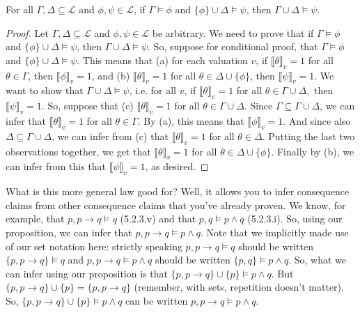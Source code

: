 \begin{enumerate}[\thesection.1]
		\begin{proposition}
		For all $\Gamma,\Delta\subseteq\mathcal{L}$ and $\phi,\psi\in\mathcal{L}$, if $\Gamma\vDash\phi$ and $\{\phi\}\cup\Delta\vDash\psi$, then $\Gamma\cup\Delta\vDash\psi$.
		\end{proposition}
		\begin{proof}
		Let $\Gamma,\Delta\subseteq\mathcal{L}$ and $\phi,\psi\in\mathcal{L}$ be arbitrary. We need to prove that  if $\Gamma\vDash\phi$ and $\{\phi\}\cup\Delta\vDash\psi$, then $\Gamma\cup\Delta\vDash\psi$. So, suppose for conditional proof, that $\Gamma\vDash\phi$ and $\{\phi\}\cup\Delta\vDash\psi$. This means that (a) for each valuation $v$, if $\llbracket\theta\rrbracket_v=1$ for all $\theta\in\Gamma$, then $\llbracket \phi\rrbracket_v=1$, and (b) $\llbracket\theta\rrbracket_v=1$ for all $\theta\in\Delta\cup\{\phi\}$, then $\llbracket \psi\rrbracket_v=1$. We want to show that $\Gamma\cup\Delta\vDash\psi$, i.e. for all $v$, if $\llbracket \theta\rrbracket_v=1$ for all $\theta\in\Gamma\cup\Delta,$ then $\llbracket\psi\rrbracket_v=1$. So, suppose that (c) $\llbracket \theta\rrbracket_v=1$ for all $\theta\in\Gamma\cup\Delta$. Since $\Gamma\subseteq \Gamma\cup \Delta$, we can infer that $\llbracket \theta\rrbracket_v=1$ for all $\theta\in\Gamma$. By (a), this means that $\llbracket \phi\rrbracket_v=1$. And since also $\Delta\subseteq \Gamma\cup \Delta$, we can infer from (c) that $\llbracket \theta\rrbracket_v=1$ for all $\theta\in\Delta$. Putting the last two observations together, we get that $\llbracket\theta\rrbracket_v=1$ for all $\theta\in\Delta\cup\{\phi\}$. Finally by (b), we can infer from this that $\llbracket\psi\rrbracket_v=1$, as desired.
		\end{proof}
What is this more general law good for? Well, it allows you to infer consequence claims from other consequence claims that you've already proven. We know, for example, that $p, p\to q\vDash q$ (5.2.3.v) and that $p,q\vDash p\land q$ (5.2.3.i). So, using our proposition, we can infer that $p,p\to q\vDash p\land q$. Note that we implicitly made use of our set notation here: strictly speaking  $p, p\to q\vDash q$ should be written  $\{p, p\to q\}\vDash q$ and $p,p\to q\vDash p\land q$ should be written $\{p,q\}\vDash p\land q$. So, what we can infer using our proposition is that $\{p, p\to q\}\cup \{p\}\vDash p\land q$. But $\{p, p\to q\}\cup \{p\}=\{p,p\to q\}$ (remember, with sets, repetition doesn't matter). So, $\{p, p\to q\}\cup \{p\}\vDash p\land q$ can be written $p,p\to q\vDash p\land q$.


\end{enumerate}
